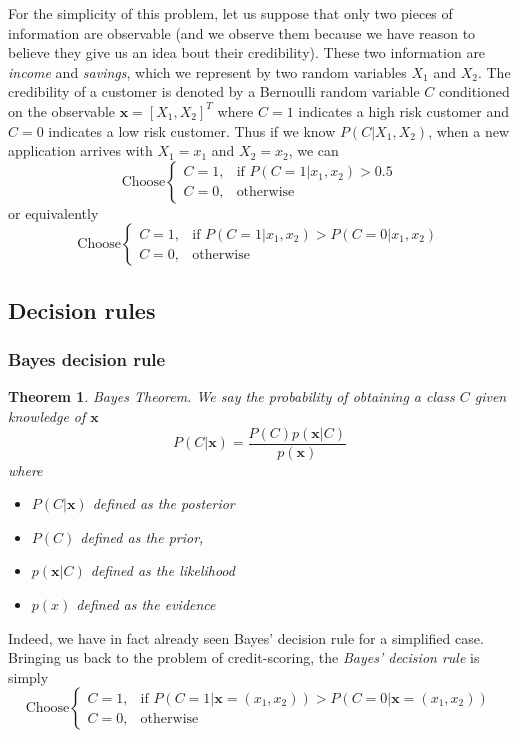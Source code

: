 \documentclass[a4paper,12pt]{article}
\newcommand{\xx}{{\bm x}}
\newtheorem*{thm}{Theorem}
\begin{document}
For the simplicity of this problem, let us suppose that only two pieces of information are observable (and we observe them because we have reason to believe they give us an idea bout their credibility). These two information are \textit{income} and \textit{savings}, which we represent by two random variables $X_1$ and $X_2$. The credibility of a customer is denoted by a Bernoulli random variable $C$ conditioned on the observable $\bm{x} = [X_1, X_2]^T$ where $C=1$ indicates a high risk customer and $C=0$ indicates a low risk customer. Thus if we know $P(C|X_1, X_2)$, when a new application arrives with $X_1 = x_1$ and $X_2 = x_2$, we can
\begin{equation*}
\text{Choose}
\begin{cases}
C = 1, & \text{if } P(C=1|x_1, x_2) > 0.5 \\
C = 0, & \text{otherwise}
\end{cases}
\end{equation*}
or equivalently
\begin{equation*}
\text{Choose}
\begin{cases}
C = 1, & \text{if } P(C=1|x_1,x_2) > P(C=0|x_1,x_2)\\
C = 0, & \text{otherwise}
\end{cases}
\end{equation*}
\subsection{Decision rules}
\subsubsection{Bayes decision rule}
\begin{thm}{Bayes Theorem.}
We say the probability of obtaining a class $C$ given knowledge of $\xx$
\begin{equation*}
P(C|\bm{x}) = \frac{P(C)p(\bm{x}|C)}{p(\bm{x})}
\end{equation*}
where 
\begin{itemize}
	\item $P(C|\xx)$ defined as the \textit{posterior}
    \item $P(C)$ defined as the \textit{prior},
    \item $p(\xx|C)$ defined as the \textit{likelihood}
    \item $p(x)$ defined as the \textit{evidence}
\end{itemize}
\end{thm}
Indeed, we have in fact already seen Bayes' decision rule for a simplified case. Bringing us back to the problem of credit-scoring, the \textit{Bayes' decision rule} is simply 
\begin{equation*}
\text{Choose}
\begin{cases}
C = 1, & \text{if } P(C=1 | \xx = (x_1,x_2)) > P(C=0|\xx = (x_1,x_2))\\
C = 0, & \text{otherwise}
\end{cases}
\end{equation*}
\end{document}
